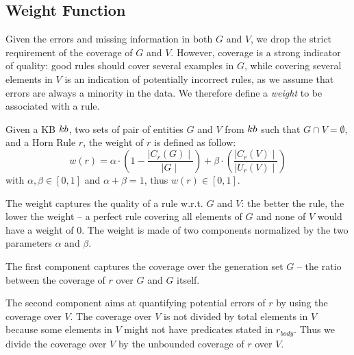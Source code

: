\subsection{Weight Function} \label{sec:krd_weight_fun}
Given the errors and missing information in both $G$ and $V$, we drop the strict requirement of the coverage of $G$ and $V$. However, coverage is a strong indicator of quality: good rules should cover several examples in $G$, while covering several elements in $V$ is an indication of potentially incorrect rules, as we assume that errors are always a minority in the data. 
We therefore define a \emph{weight} to be associated with a rule. %


\begin{definition}
	Given a KB ${\sc kb}$, two sets of pair of entities $G$ and $V$ from ${\sc kb}$ such that $G \cap V = \emptyset$, and a Horn Rule $r$, the weight of $r$ is defined as follow:
	\begin{equation} \label{eq:weight_fun}
		w(r) = \alpha \cdot (1-\frac{\mid C_{r}(G)\mid}{\mid G \mid}) +\beta \cdot (\frac{\mid C_{r}(V) \mid}{\mid U_{r}(V)\mid})
	\end{equation}
	with $\alpha,\beta \in [0,1]$ and $\alpha + \beta = 1$, thus $w(r) \in [0,1]$. 
\end{definition}

The weight 
captures the quality of a rule w.r.t. $G$ and $V$: the better the rule, the lower the weight -- a perfect rule covering all elements of $G$ and none of $V$ would have a weight of $0$.
%
The weight is made of two components normalized by the two parameters $\alpha$ and $\beta$.
%
\begin{inparaenum}[\itshape1)]
	\item The first component captures the coverage over the generation set $G$ -- the ratio between the coverage of $r$ over $G$ and $G$ itself. 
	\item The second component aims at quantifying potential errors of $r$ by using the coverage over $V$. The coverage over $V$ is not divided by total elements in $V$ because some elements in $V$ might not have predicates stated in $r_{body}$.
	Thus we divide the coverage over $V$ by the unbounded coverage of $r$ over $V$. 
\end{inparaenum}

